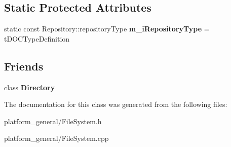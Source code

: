 \subsection*{\-Static \-Protected \-Attributes}
\begin{DoxyCompactItemize}
\item 
\hypertarget{classgeneral__server_1_1DOCTypeDefinition_a80504ea5852888a4e2db9f47acc34c56}{static const \*
\-Repository\-::repository\-Type {\bfseries m\-\_\-i\-Repository\-Type} = t\-D\-O\-C\-Type\-Definition}\label{classgeneral__server_1_1DOCTypeDefinition_a80504ea5852888a4e2db9f47acc34c56}

\end{DoxyCompactItemize}
\subsection*{\-Friends}
\begin{DoxyCompactItemize}
\item 
\hypertarget{classgeneral__server_1_1DOCTypeDefinition_a245303e8660be5fb8eb2828a8c44b773}{class {\bfseries \-Directory}}\label{classgeneral__server_1_1DOCTypeDefinition_a245303e8660be5fb8eb2828a8c44b773}

\end{DoxyCompactItemize}


\-The documentation for this class was generated from the following files\-:\begin{DoxyCompactItemize}
\item 
platform\-\_\-general/\-File\-System.\-h\item 
platform\-\_\-general/\-File\-System.\-cpp\end{DoxyCompactItemize}

